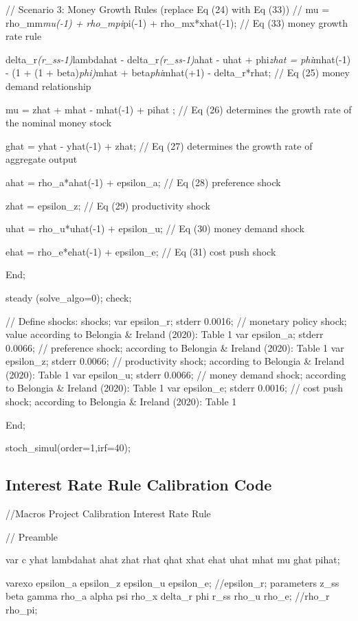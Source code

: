 \documentclass[11pt,preprint, authoryear]{elsarticle}
\numberwithin{equation}{section}
\numberwithin{figure}{section}
\numberwithin{table}{section}
\begin{document}
// Scenario 3: Money Growth Rules (replace Eq (24) with Eq (33)) // mu =
rho\_mm\emph{mu(-1) + rho\_mpi}pi(-1) + rho\_mx*xhat(-1); // Eq (33)
money growth rate rule

delta\_r\emph{(r\_ss-1)}lambdahat - delta\_r\emph{(r\_ss-1)}ahat - uhat
+ phi\emph{zhat = phi}mhat(-1) - (1 + (1 + beta)\emph{phi)}mhat +
beta\emph{phi}mhat(+1) - delta\_r*rhat; // Eq (25) money demand
relationship

mu = zhat + mhat - mhat(-1) + pihat ; // Eq (26) determines the growth
rate of the nominal money stock

ghat = yhat - yhat(-1) + zhat; // Eq (27) determines the growth rate of
aggregate output

ahat = rho\_a*ahat(-1) + epsilon\_a; // Eq (28) preference shock

zhat = epsilon\_z; // Eq (29) productivity shock

uhat = rho\_u*uhat(-1) + epsilon\_u; // Eq (30) money demand shock

ehat = rho\_e*ehat(-1) + epsilon\_e; // Eq (31) cost push shock

End;

steady (solve\_algo=0); check;

// Define shocks: shocks; var epsilon\_r; stderr 0.0016; // monetary
policy shock; value according to Belongia \& Ireland (2020): Table 1 var
epsilon\_a; stderr 0.0066; // preference shock; according to Belongia \&
Ireland (2020): Table 1 var epsilon\_z; stderr 0.0066; // productivity
shock; according to Belongia \& Ireland (2020): Table 1 var epsilon\_u;
stderr 0.0066; // money demand shock; according to Belongia \& Ireland
(2020): Table 1 var epsilon\_e; stderr 0.0016; // cost push shock;
according to Belongia \& Ireland (2020): Table 1

End;

stoch\_simul(order=1,irf=40);

\hypertarget{interest-rate-rule-calibration-code}{%
\subsection{Interest Rate Rule Calibration
Code}\label{interest-rate-rule-calibration-code}}

//Macros Project Calibration Interest Rate Rule

// Preamble

var c yhat lambdahat ahat zhat rhat qhat xhat ehat uhat mhat mu ghat
pihat;

varexo epsilon\_a epsilon\_z epsilon\_u epsilon\_e; //epsilon\_r;
parameters z\_ss beta gamma rho\_a alpha psi rho\_x delta\_r phi r\_ss
rho\_u rho\_e; //rho\_r rho\_pi;
\end{document}
